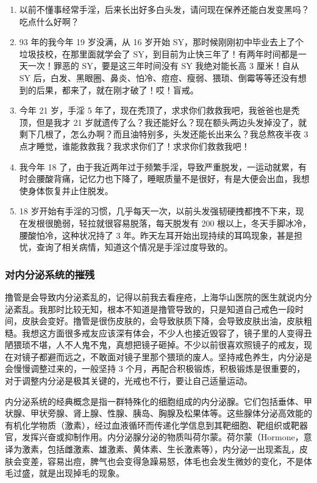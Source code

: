 \documentclass{ctexart}
\begin{document}
\begin{enumerate}
    \item 以前不懂事经常手淫，后来长出好多白头发，请问现在保养还能白发变黑吗？吃点什么好啊？
    \item 93 年的我今年 19 岁没满，从 16 岁开始 SY，那时候刚刚初中毕业去上了个垃圾技校，在那里面就学会了 SY，到目前为止快三年了！有两年时间都是一天一次！罪恶的 SY，要是这三年时间没有 SY 我绝对能长高 3 厘米！自从 SY 后，白发、黑眼圈、鼻炎、怕冷、痘痘、瘦弱、猥琐、倒霉等等还没有想到的后果，都来了，就在刚才破了！哎！盲戒。
    \item 今年 21 岁，手淫 5 年了，现在秃顶了，求求你们救救我吧，我爸爸也是秃顶，但是我才 21 岁就遗传了么？我还能好么？现在额头两边头发掉没了，就剩下几根了，怎么办啊？而且油特别多，头发还能长出来么？我总熬夜半夜 3 点才睡觉，谁能救救我？我求求你们了！求求你们救救我吧！
    \item 我今年 18 了，由于我近两年过于频繁手淫，导致严重脱发，一运动就累，有时会腰酸背痛，记忆力也下降了，睡眠质量不是很好，有是大便会出血，我想使身体恢复并止住脱发。
    \item 18 岁开始有手淫的习惯，几乎每天一次，以前头发强韧硬拽都拽不下来，现在发根很脆弱，轻拉就很容易脱落，每天脱发有 200 根以上，冬天手脚冰冷，腰酸怕冷，这种状况持了 3 年。昨天左耳开始出现持续的耳鸣现象，甚是担忧，查询了相关病情，知道这个情况是手淫过度导致的。
\end{enumerate}

\subsubsection{对内分泌系统的摧残}

撸管是会导致内分泌紊乱的，记得以前我去看痤疮，上海华山医院的医生就说内分泌紊乱。我那时比较无知，根本不知道是撸管导致的，只是知道自己戒色一段时间，皮肤会变好。撸管是很伤皮肤的，会导致肤质下降，会导致皮肤出油，皮肤粗糙。我想这方面很多戒友应该深有体会，不少人也接近毁容了，镜子里的人变得丑陋猥琐不堪，人不人鬼不鬼，真想把镜子砸掉。不少以前很喜欢照镜子的戒友，现在对镜子都避而远之，不敢面对镜子里那个猥琐的废人。坚持戒色养生，内分泌是会慢慢调整过来的，一般坚持 3 个月，再配合积极锻炼，积极锻炼是很重要的，对于调整内分泌是极其关键的，光戒也不行，要让自己适量运动。

内分泌系统的经典概念是指一群特殊化的细胞组成的内分泌腺。它们包括垂体、甲状腺、甲状旁腺、肾上腺、性腺、胰岛、胸腺及松果体等。这些腺体分泌高效能的有机化学物质（激素），经过血液循环而传递化学信息到其靶细胞、靶组织或靶器官，发挥兴奋或抑制作用。内分泌腺分泌的物质叫荷尔蒙。荷尔蒙（Hormone，意译为激素，包括雌激素、雄激素、黄体素、生长激素等），内分泌一出现紊乱，皮肤会变差，容易出痘，脾气也会变得急躁易怒，体毛也会发生微妙的变化，不是体毛过盛，就是出现掉毛的现象。
\end{document}
